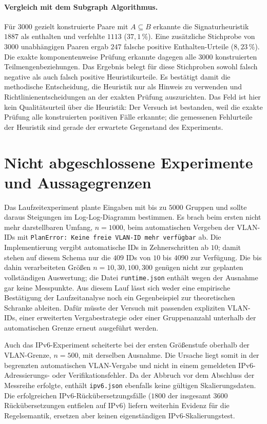 \documentclass[a4paper,12pt, twoside]{report}
\theoremstyle{definition}
\newcommand{\code}[1]{\texttt{\detokenize{#1}}}
\begin{document}
\paragraph{Vergleich mit dem Subgraph Algorithmus.}
Für $3000$ gezielt konstruierte Paare mit $A\subseteq B$ erkannte die Signaturheuristik $1887$ als enthalten und verfehlte $1113$ ($37{,}1\,\%$). Eine zusätzliche Stichprobe von $3000$ unabhängigen Paaren ergab $247$ falsche positive Enthalten-Urteile ($8{,}23\,\%$). Die exakte komponentenweise Prüfung erkannte dagegen alle $3000$ konstruierten Teilmengenbeziehungen. Das Ergebnis belegt für diese Stichproben sowohl falsch negative als auch falsch positive Heuristikurteile. Es bestätigt damit die methodische Entscheidung, die Heuristik nur als Hinweis zu verwenden und Richtlinienentscheidungen an der exakten Prüfung auszurichten. Das Feld \code{passed} ist hier kein Qualitätsurteil über die Heuristik: Der Versuch ist bestanden, weil die exakte Prüfung alle konstruierten positiven Fälle erkannte; die gemessenen Fehlurteile der Heuristik sind gerade der erwartete Gegenstand des Experiments.

\section{Nicht abgeschlossene Experimente und Aussagegrenzen}

Das Laufzeitexperiment plante Eingaben mit bis zu $5000$ Gruppen und sollte daraus Steigungen im Log-Log-Diagramm bestimmen. Es brach beim ersten nicht mehr darstellbaren Umfang, $n=1000$, beim automatischen Vergeben der VLAN-IDs mit \texttt{PlanError: Keine freie VLAN-ID mehr verfügbar} ab. Die Implementierung vergibt automatische IDs in Zehnerschritten ab $10$; damit stehen auf diesem Schema nur die $409$ IDs von $10$ bis $4090$ zur Verfügung. Die bis dahin verarbeiteten Größen $n=10,30,100,300$ genügen nicht zur geplanten vollständigen Auswertung; die Datei \texttt{runtime.json} enthält wegen der Ausnahme gar keine Messpunkte. Aus diesem Lauf lässt sich weder eine empirische Bestätigung der Laufzeitanalyse noch ein Gegenbeispiel zur theoretischen Schranke ableiten. Dafür müsste der Versuch mit passenden expliziten VLAN-IDs, einer erweiterten Vergabestrategie oder einer Gruppenanzahl unterhalb der automatischen Grenze erneut ausgeführt werden.

Auch das IPv6-Experiment scheiterte bei der ersten Größenstufe oberhalb der VLAN-Grenze, $n=500$, mit derselben Ausnahme. Die Ursache liegt somit in der begrenzten automatischen VLAN-Vergabe und nicht in einem gemeldeten IPv6-Adressierungs- oder Verifikationsfehler. Da der Abbruch vor dem Abschluss der Messreihe erfolgte, enthält \texttt{ipv6.json} ebenfalls keine gültigen Skalierungsdaten. Die erfolgreichen IPv6-Rückübersetzungsfälle ($1800$ der insgesamt $3600$ Rückübersetzungen entfielen auf IPv6) liefern weiterhin Evidenz für die Regelsemantik, ersetzen aber keinen eigenständigen IPv6-Skalierungstest.
\end{document}
